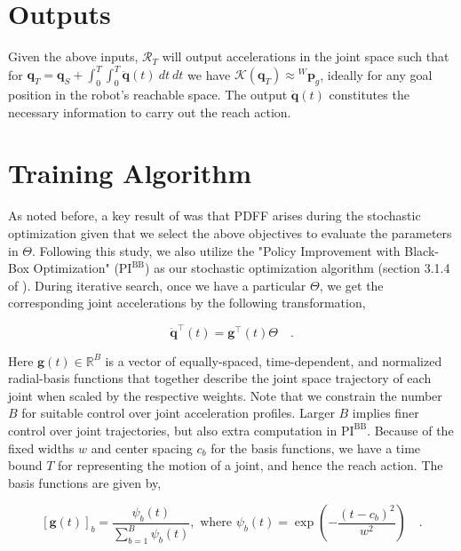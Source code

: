 \documentclass[10pt]{article}
\begin{document}
\section{Outputs}
Given the above inputs, $\mathcal{R}_T$ will output accelerations in the joint space such that for $\mathbf{q}_T = \mathbf{q}_S + \int_0^T\int_0^{T}\ddot{\mathbf{q}}(t)\:dt\:dt$ we have $\mathcal{K}(\mathbf{q}_T) \approx {^W}\mathbf{p}_{g}$, ideally for any goal position in the robot's reachable space. The output $\ddot{\mathbf{q}}(t)$ constitutes the necessary information to carry out the reach action.

\section{Training Algorithm}
\label{sec:training_algo}
As noted before, a key result of \cite{pdff} was that PDFF arises during the stochastic optimization given that we select the above objectives to evaluate the parameters in $\Theta$. Following this study, we also utilize the "Policy Improvement with Black-Box Optimization" ($\text{PI}^{\text{BB}}$) as our stochastic optimization algorithm (section 3.1.4 of \cite{pdff}). During iterative search, once we have a particular $\Theta$, we get the corresponding joint accelerations by the following transformation,

\begin{equation}
\label{eqn:dmp_theta_to_qdd}
        \ddot{\mathbf{q}}^\intercal(t) = \mathbf{g}^\intercal(t)\Theta \quad .
\end{equation}

Here $\mathbf{g}(t) \in \mathbb{R}^B$ is a vector of equally-spaced, time-dependent, and normalized radial-basis functions that together describe the joint space trajectory of each joint when scaled by the respective weights. Note that we constrain the number $B$ for suitable control over joint acceleration profiles. Larger $B$ implies finer control over joint trajectories, but also extra computation in $\text{PI}^{\text{BB}}$. Because of the fixed widths $w$ and center spacing $c_b$ for the basis functions, we have a time bound $T$ for representing the motion of a joint, and hence the reach action. The basis functions are given by,

\begin{equation}
\label{eqn:dmp_radial_basis}
    [\mathbf{g}(t)]_b = \frac{\psi_b(t)}{\sum_{b=1}^{B} \psi_b(t)}, \text{ where } \psi_b(t) = \exp{\left(-\frac{(t-c_b)^2}{w^2}\right)} \quad .
\end{equation}
\end{document}
